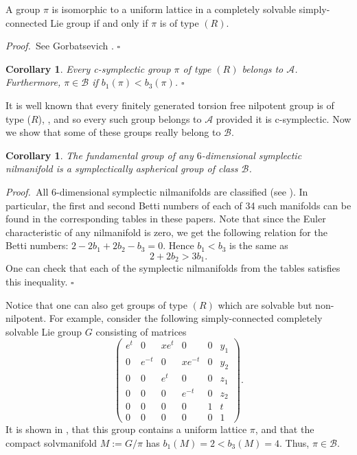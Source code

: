 \documentclass[12pt, twoside]{amsart}
\theoremstyle{plain}
\newtheorem{cory}[theorem]{Corollary}
\theoremstyle{definition}
\numberwithin{equation}{section}
\def\hqed{\hfill\hfill$\square$}
\def\AAA{{\mathcal A}}
\def\BBB{{\mathcal B}}
\def\m{\medskip}
\def\p{{\it Proof.\ }}
\begin{document}
\begin{theorem} A group  $\pi$ is isomorphic to a uniform lattice in a
completely solvable simply-connected Lie group if and only if $\pi$ is of type
$(R)$.
\end{theorem}

\p See Gorbatsevich \cite{Gb}.
\hqed

\begin{cory} Every c-symplectic group $\pi$ of type $(R)$ belongs to $\AAA$. 
Furthermore, $\pi \in \BBB$ if
$b_1(\pi)<b_3(\pi)$.
\hqed
\end{cory}

\m It is well known that every finitely
generated torsion free nilpotent group is of type ($R$), \cite{M, VGS}, and so 
every such group belongs to $\AAA$ provided it is c-symplectic. Now we show 
that 
some of these groups really belong to $\BBB$.

\begin{cory} 
\label{six}
The fundamental group of any $6$-dimensional symplectic
nilmanifold is a symplectically aspherical group of class $\BBB$.
\end{cory}

\p All 6-dimensional symplectic nilmanifolds are classified (see \cite{Sa,
IRTU}). In particular, the first and second Betti numbers of each of 34 such
manifolds can be found in the corresponding tables in these papers. Note that
since the Euler characteristic of any nilmanifold is zero, we get the 
following
relation for the Betti numbers: $2-2b_1+2b_2-b_3=0$. Hence $b_1<b_3$ is the
same as 
%
$$
2+2b_2>3b_1.
$$
% 
One can check that each of the symplectic nilmanifolds from the tables
\cite{Sa, IRTU} satisfies this inequality.
\hqed

\m 
 Notice that one can also get groups of type $(R)$ which are solvable but
non-nilpotent.
 For example, consider the following simply-connected completely solvable Lie
group $G$ consisting of matrices
%
$$
\begin{pmatrix} e^t & 0 & xe^t & 0 & 0 & y_1\\ 0 & e^{-t} & 0 & xe^{-t} & 0 & 
y_2\\ 0
& 0 & e^t & 0 & 0 & z_1\\ 0 & 0 & 0 & e^{-t} & 0 & z_2\\ 0 & 0 &  0 & 0 & 1& 
t\\
0 & 0 & 0 &  0 & 0 & 1
\end{pmatrix} .
$$ It is shown in \cite{FLS}, that this group contains a uniform lattice
$\pi$, and that the compact solvmanifold $M:=G/\pi$ has 
$b_1(M)=2<b_3(M)=4$.
Thus, $\pi \in \BBB$.
\end{document}
